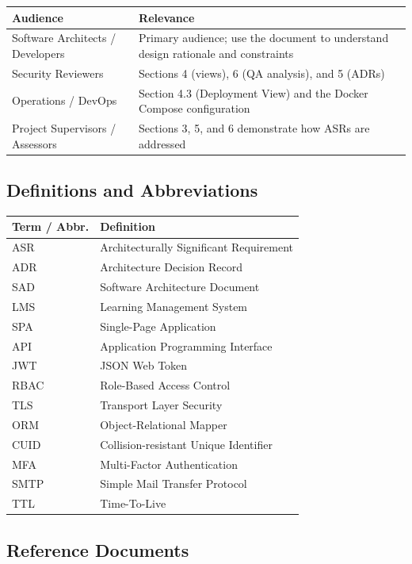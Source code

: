 \documentclass[12pt,a4paper]{article}
\begin{document}
\begin{tabularx}{\textwidth}{L{4.5cm} L{9cm}}
  \toprule
  \textbf{Audience} & \textbf{Relevance} \\
  \midrule
  Software Architects / Developers & Primary audience; use the document to understand design rationale and constraints \\
  Security Reviewers & Sections 4 (views), 6 (QA analysis), and 5 (ADRs) \\
  Operations / DevOps & Section 4.3 (Deployment View) and the Docker Compose configuration \\
  Project Supervisors / Assessors & Sections 3, 5, and 6 demonstrate how ASRs are addressed \\
  \bottomrule
\end{tabularx}

\subsection{Definitions and Abbreviations}

\begin{tabularx}{\textwidth}{L{3cm} L{10.5cm}}
  \toprule
  \textbf{Term / Abbr.} & \textbf{Definition} \\
  \midrule
  ASR     & Architecturally Significant Requirement \\
  ADR     & Architecture Decision Record \\
  SAD     & Software Architecture Document \\
  LMS     & Learning Management System \\
  SPA     & Single-Page Application \\
  API     & Application Programming Interface \\
  JWT     & JSON Web Token \\
  RBAC    & Role-Based Access Control \\
  TLS     & Transport Layer Security \\
  ORM     & Object-Relational Mapper \\
  CUID    & Collision-resistant Unique Identifier \\
  MFA     & Multi-Factor Authentication \\
  SMTP    & Simple Mail Transfer Protocol \\
  TTL     & Time-To-Live \\
  \bottomrule
\end{tabularx}

\subsection{Reference Documents}
\end{document}
